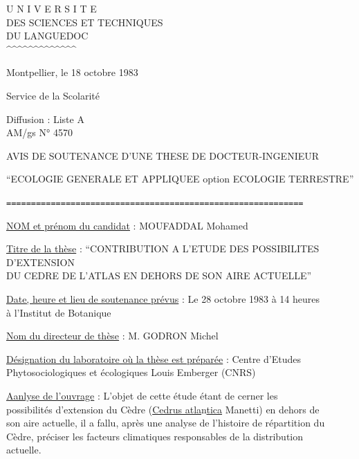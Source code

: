 

\noindent\begin{minipage}[t]{0.43\textwidth}
\centering
U N I V E R S I T E\\
DES SCIENCES ET TECHNIQUES\\
DU LANGUEDOC\\
\textasciicircum\textasciicircum\textasciicircum\textasciicircum\textasciicircum\textasciicircum\textasciicircum\textasciicircum\textasciicircum\textasciicircum\textasciicircum\textasciicircum\textasciicircum
\end{minipage}\hfill
\begin{minipage}[t]{0.49\textwidth}
\raggedleft
\vspace{1.5\baselineskip}
Montpellier, le 18 octobre 1983
\end{minipage}

Service de la Scolarité

Diffusion : Liste A\\
AM/gs \qquad N° 4570

\begin{center}
AVIS DE SOUTENANCE D'UNE THESE DE DOCTEUR-INGENIEUR

``ECOLOGIE GENERALE ET APPLIQUEE \quad option \quad ECOLOGIE TERRESTRE''

\texttt{============================================================}
\end{center}

\uline{NOM et prénom du candidat} : MOUFADDAL Mohamed

\uline{Titre de la thèse} : ``CONTRIBUTION A L'ETUDE DES POSSIBILITES D'EXTENSION\\
DU CEDRE DE L'ATLAS EN DEHORS DE SON AIRE ACTUELLE''

\uline{Date, heure et lieu de soutenance prévus} : Le 28 octobre 1983 à 14 heures\\
à l'Institut de Botanique

\uline{Nom du directeur de thèse} : M. GODRON Michel

\uline{Désignation du laboratoire où la thèse est préparée} : Centre d'Etudes\\
Phytosociologiques et écologiques Louis Emberger (CNRS)

\uline{Aanlyse de l'ouvrage} : L'objet de cette étude étant de cerner les\\
possibilités d'extension du Cèdre (\uline{Cedrus atla}n\uline{tica} Manetti) en dehors de\\
son aire actuelle, il a fallu, après une analyse de l'histoire de répartition du\\
Cèdre, préciser les facteurs climatiques responsables de la distribution\\
actuelle.

